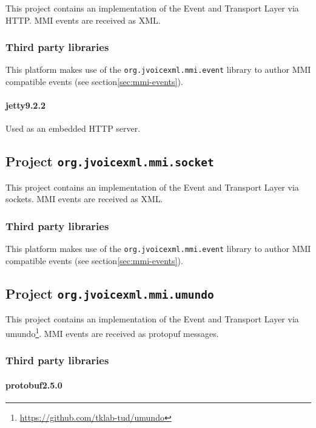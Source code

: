 \documentclass[11pt,a4paper]{article}
\begin{document}
This project contains an implementation of the Event and Transport Layer
via HTTP. MMI events are received as XML.

\subsubsection{Third party libraries}

This platform makes use of the \lstinline{org.jvoicexml.mmi.event} library
to author MMI compatible events (see section\ref{sec:mmi-events}).

\paragraph{jetty9.2.2}

Used as an embedded HTTP server.

\subsection{Project \texttt{org.jvoicexml.mmi.socket}}

This project contains an implementation of the Event and Transport Layer
via sockets. MMI events are received as XML.

\subsubsection{Third party libraries}

This platform makes use of the \lstinline{org.jvoicexml.mmi.event} library
to author MMI compatible events (see section\ref{sec:mmi-events}).

\subsection{Project \texttt{org.jvoicexml.mmi.umundo}}

This project contains an implementation of the Event and Transport Layer
via umundo\footnote{\url{https://github.com/tklab-tud/umundo}}.
MMI events are received as protopuf messages.

\subsubsection{Third party libraries}

\paragraph{protobuf2.5.0}
\end{document}
